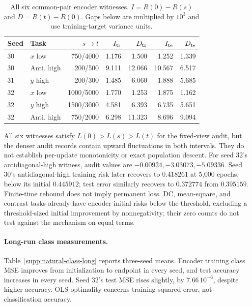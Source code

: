 \begin{table}[t]
\centering\small
\caption{All six common-pair encoder witnesses. $I=R(0)-R(s)$ and $D=R(t)-R(0)$. Gaps below are multiplied by $10^3$ and use training-target variance units.}
\label{supp:natural-witnesses}
\setlength{\tabcolsep}{1.6pt}
\begin{tabular}{llrrrrr}
\toprule
Seed&Task&$s\to t$&$I_{\rm tr}$&$D_{\rm tr}$&$I_{\rm te}$&$D_{\rm te}$\\\midrule
30&$x$ low&750/4000&1.176&1.500&1.252&1.339\\
30&Anti. high&200/500&9.111&12.066&10.567&6.517\\
31&$y$ high&200/300&1.485&6.060&1.888&5.685\\
32&$x$ low&1000/5000&1.770&1.253&1.875&1.162\\
32&$y$ high&1500/3000&4.581&6.393&6.735&5.651\\
32&Anti. high&750/2000&6.298&11.323&8.696&9.094\\\bottomrule
\end{tabular}
\end{table}

All six witnesses satisfy $L(0)>L(s)>L(t)$ for the fixed-view audit, but the denser audit records contain upward fluctuations in both intervals. They do not establish per-update monotonicity or exact population descent. For seed 32's antidiagonal-high witness, audit values are $-0.00924,-3.03073,-5.09336$. Seed 30's antidiagonal-high training risk later recovers to $0.418261$ at 5,000 epochs, below its initial $0.445912$; test error similarly recovers to $0.372774$ from $0.395159$. Finite-time rebound does not imply permanent loss. DC, mean-square, and contrast tasks already have encoder initial risks below the threshold, excluding a threshold-sized initial improvement by nonnegativity; their zero counts do not test against the mechanism on equal terms.

\paragraph{Long-run class measurements.}
Table~\ref{supp:natural-class-long} reports three-seed means. Encoder training class MSE improves from initialization to endpoint in every seed, and test accuracy increases in every seed. Seed 32's test MSE rises slightly, by $7.66\,10^{-6}$, despite higher accuracy. OLS optimality concerns training squared error, not classification accuracy.

